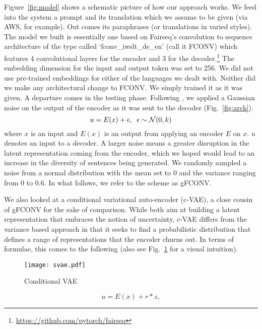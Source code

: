 \documentclass[dvipdfmx,11pt,a4paper]{article}
\begin{document}
\par Figure~\ref{fig:model} shows a schematic picture of how our approach works. We feed into the system a prompt and its translation which we assume to be given (via AWS, for example). Out comes its paraphrases (or translations in varied styles). The model we built is essentially one based on  Fairseq's convolution to sequence architecture  of the type called `fconv\_iwslt\_de\_en' (call it FCONV) which features 4 convolutional layers for the encoder and 3 for the decoder.\footnote{\url{https://github.com/pytorch/fairseq}}   
The embedding dimension for the input and output token was set to 256.   We did not use pre-trained embeddings for either of the languages we dealt with. Neither did we make any architectural change to FCONV.  We simply trained it as it was given.  A departure comes in the testing phase.  Following \cite {guu-etal-2018-generating}, we applied a Gaussian noise on the output of the encoder as it was sent to the decoder (Fig.~\ref{fig:arch}). 
\begin{equation}\label{eqn:gfconv}
u = E(x) + \epsilon,\;\;  \epsilon \sim {\cal N} (0, k)
\end{equation}
where $x$ is an input and $E(x)$ is an output from applying an encoder $E$ on $x$.  $u$ denotes an input to a decoder. 
 A larger noise means a greater disruption in the latent representation coming from the encoder, which we hoped would   lead to an increase in the diversity of sentences being generated.  We randomly sampled a noise from a normal distribution with the mean set to 0 and the variance ranging from 0 to 0.6. In what follows, we refer to the scheme as gFCONV.
%
\par We also looked at a conditional variational auto-encoder (c-VAE), a close cousin of gFCONV for the sake of comparison.  While both aim at building a latent representation that embraces the notion of uncertainty,  c-VAE 
differs from the variance based approach in that it seeks to find a probabilistic distribution that defines a range of representations that the encoder churns out. In terms of formulae, this comes to the following (also see Fig.~\ref{fig:svae}
for a visual intuition). 
 \begin{figure}
\texttt{[image: svae.pdf]}
\caption{Conditional  VAE  \label{fig:svae}}
\end{figure}
\begin{equation} \label{eqn:cvae}
u = E(x)  + r * z,
\end{equation}
\end{document}
